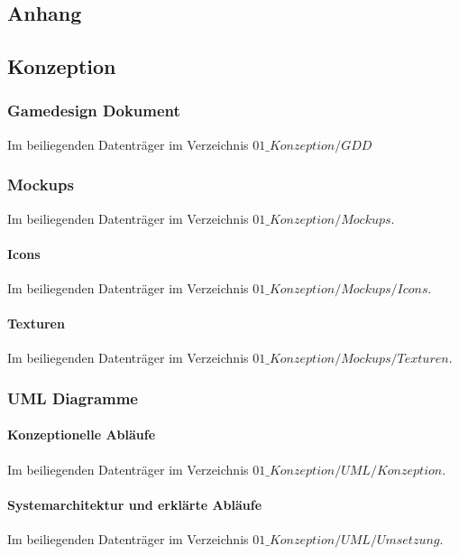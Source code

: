 \documentclass[
	12pt,
	a4paper,
	bibtotoc,
	cleardoubleempty, 
	idxtotoc,
	ngerman,
	openright
	final,
	listof=nochaptergap,
	]{scrbook}
\begin{document}

\singlespacing





\let\chaptermark\oldchaptermark

\begin{appendices}
\chapter{Anhang}
\section{Konzeption}
\subsection{Gamedesign Dokument}
Im beiliegenden Datenträger im Verzeichnis $01\_Konzeption/GDD$
\subsection{Mockups}
Im beiliegenden Datenträger im Verzeichnis $01\_Konzeption/Mockups$.
\subsubsection{Icons}
Im beiliegenden Datenträger im Verzeichnis $01\_Konzeption/Mockups/Icons$.
\subsubsection{Texturen}
Im beiliegenden Datenträger im Verzeichnis $01\_Konzeption/Mockups/Texturen$.
\subsection{UML Diagramme}
\subsubsection{Konzeptionelle Abläufe}
Im beiliegenden Datenträger im Verzeichnis $01\_Konzeption/UML/Konzeption$.
\subsubsection{Systemarchitektur und erklärte Abläufe}\label{anh:uml-dev}
Im beiliegenden Datenträger im Verzeichnis $01\_Konzeption/UML/Umsetzung$.

\end{appendices}
\end{document}
